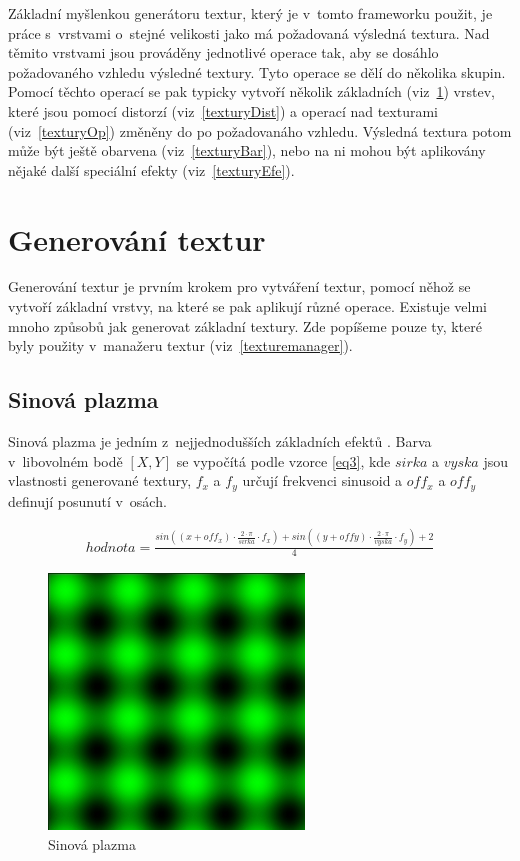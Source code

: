 Základní myšlenkou generátoru textur, který je v~tomto frameworku použit, je práce s~vrstvami o~stejné velikosti jako má požadovaná výsledná textura.
Nad těmito vrstvami jsou prováděny jednotlivé operace tak, aby se dosáhlo požadovaného vzhledu výsledné textury.
Tyto operace se dělí do několika skupin.
Pomocí těchto operací se pak typicky vytvoří několik základních (viz~\ref{texturyGen}) vrstev, které jsou pomocí distorzí (viz~\ref{texturyDist}) a operací nad texturami (viz~\ref{texturyOp})  změněny do po požadovanáho vzhledu.
Výsledná textura potom může být ještě obarvena (viz~\ref{texturyBar}), nebo na ni mohou být aplikovány nějaké další speciální efekty (viz~\ref{texturyEfe}).

\section{Generování textur} \label{texturyGen}
Generování textur je prvním krokem pro vytváření textur, pomocí něhož se vytvoří základní vrstvy, na které se pak aplikují různé operace.
Existuje velmi mnoho způsobů jak generovat základní textury.
Zde popíšeme pouze ty, které byly použity v~manažeru textur (viz~\ref{texturemanager}).
\subsection{Sinová plazma}
Sinová plazma je jedním z~nejjednodušších základních efektů \cite{plasma}.
Barva v~libovolném bodě $[X,Y]$ se vypočítá podle vzorce \ref{eq3}, kde $sirka$ a $vyska$ jsou vlastnosti generované textury, $f_x$ a $f_y$ určují frekvenci sinusoid a $off_x$ a $off_y$ definují posunutí v~osách.

\begin{eqnarray}
  hodnota = \frac{sin((x + off_x) \cdot \frac{2 \cdot \pi}{sirka} \cdot f_x) + sin((y + offy) \cdot \frac{2 \cdot \pi}{vyska} \cdot f_y) + 2}{4} \label{eq3}
\end{eqnarray}

\begin{figure}[h]
    \begin{center}
      \includegraphics[scale=0.65]{fig/sineTex} 
      \caption{Sinová plazma} 
      \label{sinTex}
    \end{center}
\end{figure}

